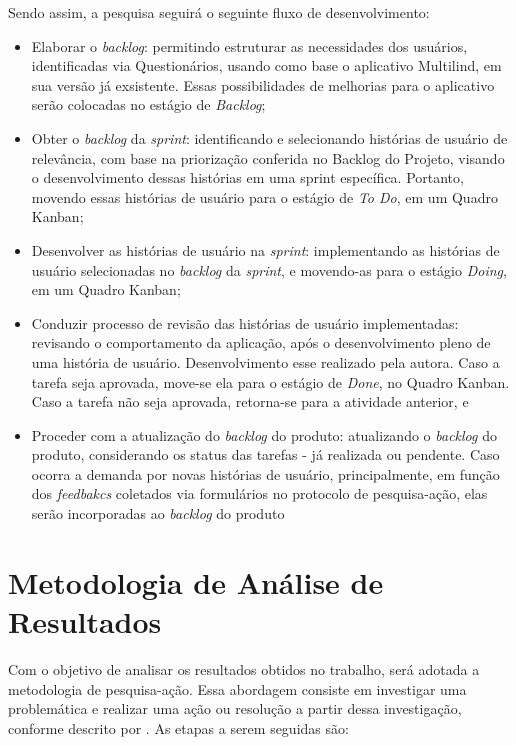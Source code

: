 Sendo assim, a pesquisa seguirá o seguinte fluxo de desenvolvimento:

\begin{itemize}
	\item Elaborar o \textit{backlog}: permitindo estruturar as necessidades dos usuários, identificadas via Questionários, usando como base o aplicativo Multilind, em sua versão já exsistente. Essas possibilidades de melhorias para o aplicativo serão colocadas no estágio de \textit{Backlog};
	\item Obter o \textit{backlog} da \textit{sprint}:  identificando e selecionando histórias de usuário de relevância, com base na priorização conferida no Backlog do Projeto, visando o desenvolvimento dessas histórias em uma sprint específica. Portanto, movendo essas histórias de usuário para o estágio de
	\textit{To Do}, em um Quadro Kanban;
	\item Desenvolver as histórias de usuário na \textit{sprint}: implementando as histórias de usuário selecionadas no \textit{backlog} da \textit{sprint}, e movendo-as para o estágio \textit{Doing}, em um Quadro Kanban;
	\item Conduzir processo de revisão das histórias de usuário implementadas: revisando o comportamento da aplicação, após o desenvolvimento pleno de uma história de usuário. Desenvolvimento esse realizado pela autora. Caso a tarefa seja
	aprovada, move-se ela para o estágio de \textit{Done}, no Quadro Kanban. Caso a tarefa não seja aprovada, retorna-se para a atividade anterior, e
	\item Proceder com a atualização do \textit{backlog} do produto: atualizando o \textit{backlog} do produto, considerando os status das tarefas - já realizada ou pendente. Caso ocorra a demanda por novas histórias de usuário, principalmente, em função dos \textit{feedbakcs} coletados via formulários no protocolo de pesquisa-ação, elas serão incorporadas ao \textit{backlog} do produto
\end{itemize}

\section{Metodologia de Análise de Resultados}
\label{sec:Metodologia de Analise de Resultados}
Com o objetivo de analisar os resultados obtidos no trabalho, será adotada a metodologia de pesquisa-ação. Essa abordagem consiste em investigar uma problemática e realizar uma ação ou resolução a partir dessa investigação, conforme descrito por . As etapas a 
serem seguidas são:

